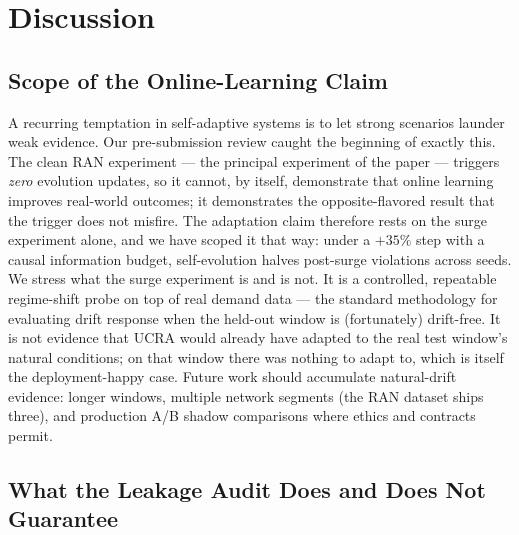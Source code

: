 \section{Discussion}
\label{sec:discussion}

\subsection{Scope of the Online-Learning Claim}

A recurring temptation in self-adaptive systems is to let strong
scenarios launder weak evidence. Our pre-submission review caught the
beginning of exactly this. The clean RAN experiment --- the principal
experiment of the paper --- triggers \emph{zero} evolution updates,
so it cannot, by itself, demonstrate that online learning improves
real-world outcomes; it demonstrates the opposite-flavored result
that the trigger does not misfire. The adaptation claim therefore
rests on the surge experiment alone, and we have scoped it that way:
under a $+35\%$ step with a causal information budget, self-evolution
halves post-surge violations across seeds. We stress what the surge
experiment is and is not. It is a controlled, repeatable regime-shift
probe on top of real demand data --- the standard methodology for
evaluating drift response when the held-out window is (fortunately)
drift-free. It is not evidence that UCRA would already have adapted
to the real test window's natural conditions; on that window there
was nothing to adapt to, which is itself the deployment-happy case.
Future work should accumulate natural-drift evidence: longer windows,
multiple network segments (the RAN dataset ships three), and
production A/B shadow comparisons where ethics and contracts permit.

\subsection{What the Leakage Audit Does and Does Not Guarantee}

